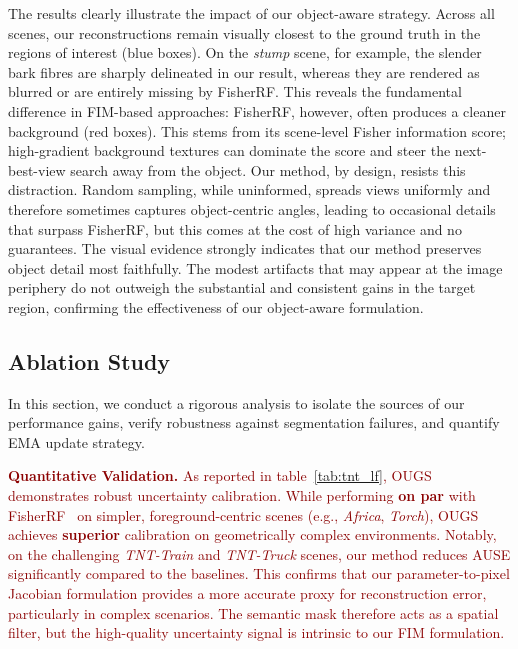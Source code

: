 \documentclass{egpubl}
\newcommand{\rev}[1]{\textcolor{darkred}{#1}}
\begin{document}
The results clearly illustrate the impact of our object-aware strategy. Across all scenes, our reconstructions remain visually closest to the ground truth in the regions of interest (blue boxes). On the \textit{stump} scene, for example, the slender bark fibres are sharply delineated in our result, whereas they are rendered as blurred or are entirely missing by FisherRF. This reveals the fundamental difference in FIM-based approaches: FisherRF, however, often produces a cleaner background (red boxes). This stems from its scene-level Fisher information score; high-gradient background textures can dominate the score and steer the next-best-view search away from the object. Our method, by design, resists this distraction. Random sampling, while uninformed, spreads views uniformly and therefore sometimes captures object-centric angles, leading to occasional details that surpass FisherRF, but this comes at the cost of high variance and no guarantees. The visual evidence strongly indicates that our method preserves object detail most faithfully. The modest artifacts that may appear at the image periphery do not outweigh the substantial and consistent gains in the target region, confirming the effectiveness of our object-aware formulation.

\subsection{Ablation Study}
\label{sec:ablation}

In this section, we conduct a rigorous analysis to isolate the sources of our performance gains, verify robustness against segmentation failures, and quantify EMA update strategy.

\rev{\textbf{Quantitative Validation.} 
As reported in table~\ref{tab:tnt_lf}, OUGS demonstrates robust uncertainty calibration. While performing \textbf{on par} with FisherRF~\cite{jiangFisherRFActiveView2024} on simpler, foreground-centric scenes (e.g., \textit{Africa}, \textit{Torch}), OUGS achieves \textbf{superior} calibration on geometrically complex environments. 
Notably, on the challenging \textit{TNT-Train} and \textit{TNT-Truck} scenes, our method reduces AUSE significantly compared to the baselines.
This confirms that our parameter-to-pixel Jacobian formulation provides a more accurate proxy for reconstruction error, particularly in complex scenarios. The semantic mask therefore acts as a spatial filter, but the high-quality uncertainty signal is intrinsic to our FIM formulation. }
\end{document}
